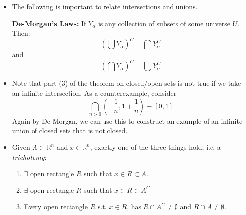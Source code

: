 \begin{itemize}
\begin{proof}
\begin{enumerate}
                        We can do something similar for the second part. Suppose $B_i,\, i=1,\dots, n$ is closed. Then: 
                        \begin{equation}
                            \left(\bigcup_{i=1}\right)^C = \bigcap_{i=1}^n B_i^C
                        \end{equation}
                        We've shown that the right hand side is open, so $\bigcup_{i=1}$ must be closed.
              \end{enumerate}
          \end{proof}
          \item The following is important to relate intersections and unions.
          \begin{theorem}
              \textbf{De-Morgan's Laws:} If $Y_\alpha$ is any collection of subsets of some universe $U$. Then:
              \begin{equation}
                  \left(\bigcup Y_\alpha\right)^C = \bigcap Y_\alpha^C
              \end{equation}
              and
              \begin{equation}
                  \left(\bigcap Y_\alpha\right)^C = \bigcup Y_\alpha^C
              \end{equation}
          \end{theorem}
          \item Note that part (3) of the theorem on closed/open sets is not true if we take an infinite intersection. As a counterexample, consider 
          \begin{equation}
              \bigcap_{n>0} \left(-\frac{1}{n},1+\frac{1}{n}\right) = [0,1]
          \end{equation}
          Again by De-Morgan, we can use this to construct an example of an infinite union of closed sets that is not closed.
          \item Given $A \subset \mathbb{R}^n$ and $x\in \mathbb{R}^n$, exactly one of the three things hold, i.e. a \textit{trichotomy}:
          \begin{enumerate}
              \item $\exists$ open rectangle $R$ such that $x\in R \subset A.$
              \item $\exists$ open rectangle $R$ such that $x\in R \subset A^C$
              \item Every open rectangle $R$ s.t. $x\in R$, has $R \cap A^C \neq \emptyset$ and $R \cap A  \neq \emptyset.$
          \end{enumerate}

\end{itemize}
